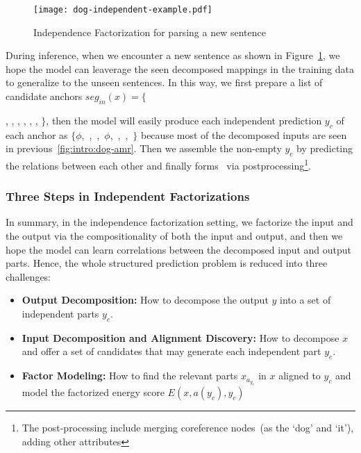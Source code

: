 \begin{figure}[!tbp]
\centering
\texttt{[image: dog-independent-example.pdf]}
\caption{\label{fig:intro:independent-example}Independence
  Factorization for parsing a new sentence }
\end{figure}

During inference, when we encounter a new sentence as shown in
Figure~\ref{fig:intro:independent-example}, we hope the model can
leaverage the seen decomposed mappings in the training data to
generalize to the unseen sentences. In this way, we first prepare a
list of candidate anchors $seg_{in}(x)=\{${,
  , , , ,
  , $\}$, then the model will easily produce
  each independent prediction $y_{c}$ of each anchor as
  $\{\phi$,~,~,~$\phi$,~,~,~$\}$
  because most of the decomposed inputs are seen in
  previous~\autoref{fig:intro:dog-amr}. Then we assemble the non-empty
  $y_{c}$ by predicting the relations between each other and finally
  forms \OUT~via postprocessing\footnote{The post-processing include
    merging coreference nodes~(as the `dog' and `it'), adding other
    attributes}.

\subsubsection{Three Steps in Independent Factorizations}
\label{sssec:intro:steps-inductive-bias}
In summary, in the independence factorization setting, we factorize
the input and the output via the compositionality of both the input
and output, and then we hope the model can learn correlations between
the decomposed input and output parts. Hence, the whole structured
prediction problem is reduced into three challenges:

\begin{itemize}
\item \textbf{Output Decomposition:} How to decompose the output $y$
  into a set of independent parts $y_{c}$.

\item \textbf{Input Decomposition and Alignment Discovery:} How to decompose $x$ and offer a
  set of candidates that may generate each independent part $y_{c}$.
\item \textbf{Factor Modeling:} How to find the relevant parts
  $x_{a_{y_{c}}}$ in $x$ aligned to ${y_{c}}$ and model the factorized
  energy score $E(x, a(y_{c}), y_{c})$
\end{itemize}

}
